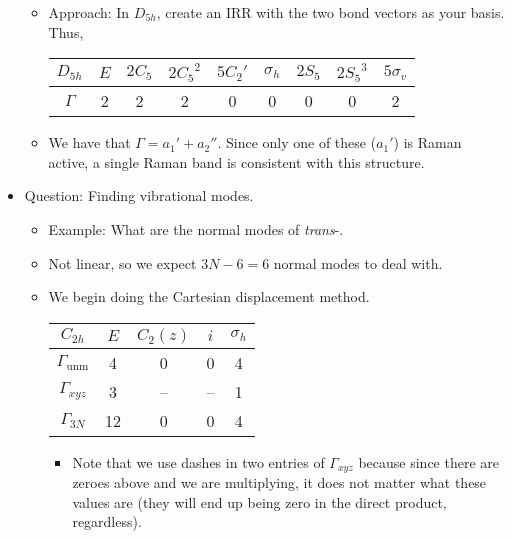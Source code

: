 \documentclass[../notes.tex]{subfiles}
\begin{document}
\begin{itemize}
\begin{itemize}
        \item Approach: In $D_{5h}$, create an IRR with the two  bond vectors as your basis. Thus,
        \begin{center}
            \small
            \renewcommand{\arraystretch}{1.2}
            \begin{tabular}{c|cccccccc}
                $D_{5h}$ & $E$ & $2C_5$ & $2{C_5}^2$ & $5C_2'$ & $\sigma_h$ & $2S_5$ & $2{S_5}^3$ & $5\sigma_v$\\
                \hline
                $\Gamma$ & 2 & 2 & 2 & 0 & 0 & 0 & 0 & 2
            \end{tabular}
        \end{center}
        \item We have that $\Gamma=a_1'+a_2''$. Since only one of these ($a_1'$) is Raman active, a single Raman band is consistent with this structure.
    \end{itemize}
    \item Question: Finding vibrational modes.
    \begin{itemize}
        \item Example: What are the normal modes of \emph{trans}-.
        \item Not linear, so we expect $3N-6=6$ normal modes to deal with.
        \item We begin doing the Cartesian displacement method.
        \begin{center}
            \small
            \renewcommand{\arraystretch}{1.2}
            \begin{tabular}{c|cccc}
                $C_{2h}$ & $E$ & $C_2(z)$ & $i$ & $\sigma_h$\\
                \hline
                $\Gamma_\text{unm}$ & 4 & 0 & 0 & 4\\
                $\Gamma_{xyz}$ & 3 & -- & -- & 1\\
                \hline
                $\Gamma_{3N}$ & 12 & 0 & 0 & 4\\
            \end{tabular}
        \end{center}
        \begin{itemize}
            \item Note that we use dashes in two entries of $\Gamma_{xyz}$ because since there are zeroes above and we are multiplying, it does not matter what these values are (they will end up being zero in the direct product, regardless).
        \end{itemize}

\end{itemize}
\end{itemize}
\end{document}
